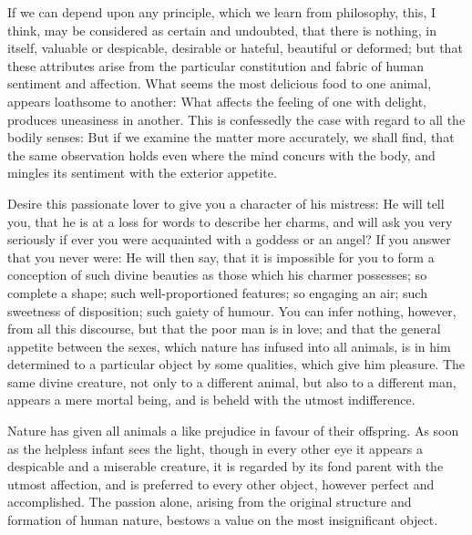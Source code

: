  If we can depend upon any principle, which we learn from
philosophy, this, I think, may be considered as certain and undoubted,
that there is nothing, in itself, valuable or despicable, desirable or
hateful, beautiful or deformed; but that these attributes arise from
the particular constitution and fabric of human sentiment and
affection. What seems the most delicious food to one animal, appears
loathsome to another: What affects the feeling of one with delight,
produces uneasiness in another. This is confessedly the case with
regard to all the bodily senses: But if we examine the matter more
accurately, we shall find, that the same observation holds even where
the mind concurs with the body, and mingles its sentiment with the
exterior appetite.

Desire this passionate lover to give you a character of his mistress:
He will tell you, that he is at a loss for words to describe her
charms, and will ask you very seriously if ever you were acquainted
with a goddess or an angel? If you answer that you never were: He will
then say, that it is impossible for you to form a conception of such
divine beauties as those which his charmer possesses; so complete a
shape; such well-proportioned features; so engaging an air; such
sweetness of disposition; such gaiety of humour. You can infer
nothing, however, from all this discourse, but that the poor man is in
love; and that the general appetite between the sexes, which nature
has infused into all animals, is in him determined to a particular
object by some qualities, which give him pleasure. The same divine
creature, not only to a different animal, but also to a different man,
appears a mere mortal being, and is beheld with the utmost
indifference.

Nature has given all animals a like prejudice in favour of their
offspring. As soon as the helpless infant sees the light, though in
every other eye it appears a despicable and a miserable creature, it
is regarded by its fond parent with the utmost affection, and is
preferred to every other object, however perfect and accomplished. The
passion alone, arising from the original structure and formation of
human nature, bestows a value on the most insignificant object.

